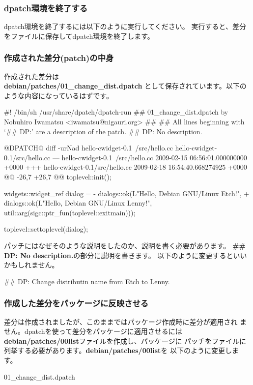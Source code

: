 \documentclass[mingoth,a4paper]{jsarticle}
\begin{document}
\subsubsection{dpatch環境を終了する}
dpatch環境を終了するには以下のように実行してください。
実行すると、差分をファイルに保存してdpatch環境を終了します。

\subsubsection{作成された差分(patch)の中身}
作成された差分は\\
{\bf debian/patches/01\_change\_dist.dpatch}
として保存されています。以下のような内容になっているはずです。
\begin{commandline}
#! /bin/sh /usr/share/dpatch/dpatch-run
## 01_change_dist.dpatch by Nobuhiro Iwamatsu <iwamatsu@nigauri.org>
##
## All lines beginning with `## DP:' are a description of the patch.
## DP: No description.

@DPATCH@
diff -urNad hello-cwidget-0.1~/src/hello.cc hello-cwidget-0.1/src/hello.cc
--- hello-cwidget-0.1~/src/hello.cc 2009-02-15 06:56:01.000000000 +0000
+++ hello-cwidget-0.1/src/hello.cc  2009-02-18 16:54:40.668274925 +0000
@@ -26,7 +26,7 @@
    toplevel::init();

    widgets::widget_ref dialog =
-       dialogs::ok(L"Hello, Debian GNU/Linux Etch!",
+       dialogs::ok(L"Hello, Debian GNU/Linux Lenny!",
            util::arg(sigc::ptr_fun(toplevel::exitmain)));

    toplevel::settoplevel(dialog);
\end{commandline}
パッチにはなぜそのような説明をしたのか、説明を書く必要があります。
{\bf \#\# DP: No description.}の部分に説明を書きます。
以下のように変更するといいかもしれません。
\begin{commandline}
## DP: Change distributin name from Etch to Lenny.
\end{commandline}

\subsubsection{作成した差分をパッケージに反映させる}

差分は作成されましたが、このままではパッケージ作成時に差分が適用され
ません。dpatchを使って差分をパッケージに適用させるには{\bf
debian/patches/00list}ファイルを作成し、パッケージに
パッチをファイルに列挙する必要があります。{\bf debian/patches/00list}を
以下のように変更します。
\begin{commandline}
01_change_dist.dpatch
\end{commandline}
\end{document}
